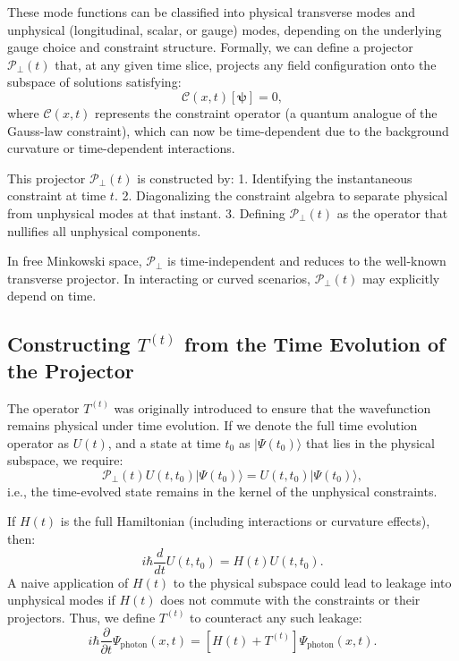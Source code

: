 \documentclass[aps,prl,twocolumn,showpacs,showkeys,superscriptaddress,amsmath,amssymb]{revtex4-2}
\begin{document}
These mode functions can be classified into physical transverse modes and unphysical (longitudinal, scalar, or gauge) modes, depending on the underlying gauge choice and constraint structure. Formally, we can define a projector $\mathcal{P}_\perp(t)$ that, at any given time slice, projects any field configuration onto the subspace of solutions satisfying:
\begin{equation}
\mathcal{C}(x,t)[\bm{\psi}] = 0,
\end{equation}
where $\mathcal{C}(x,t)$ represents the constraint operator (a quantum analogue of the Gauss-law constraint), which can now be time-dependent due to the background curvature or time-dependent interactions.

This projector $\mathcal{P}_\perp(t)$ is constructed by:
1. Identifying the instantaneous constraint at time $t$.
2. Diagonalizing the constraint algebra to separate physical from unphysical modes at that instant.
3. Defining $\mathcal{P}_\perp(t)$ as the operator that nullifies all unphysical components.

In free Minkowski space, $\mathcal{P}_\perp$ is time-independent and reduces to the well-known transverse projector. In interacting or curved scenarios, $\mathcal{P}_\perp(t)$ may explicitly depend on time.

\subsection{Constructing \texorpdfstring{$T^{(t)}$}{T(t)} from the Time Evolution of the Projector}

The operator $T^{(t)}$ was originally introduced to ensure that the wavefunction remains physical under time evolution. If we denote the full time evolution operator as $U(t)$, and a state at time $t_0$ as $|\Psi(t_0)\rangle$ that lies in the physical subspace, we require:
\begin{equation}
\mathcal{P}_\perp(t) U(t,t_0)|\Psi(t_0)\rangle = U(t,t_0)|\Psi(t_0)\rangle,
\end{equation}
i.e., the time-evolved state remains in the kernel of the unphysical constraints.

If $H(t)$ is the full Hamiltonian (including interactions or curvature effects), then:
\begin{equation}
i\hbar \frac{d}{dt}U(t,t_0) = H(t)U(t,t_0).
\end{equation}
A naive application of $H(t)$ to the physical subspace could lead to leakage into unphysical modes if $H(t)$ does not commute with the constraints or their projectors. Thus, we define $T^{(t)}$ to counteract any such leakage:
\begin{equation}
i\hbar \frac{\partial}{\partial t}\Psi_{\text{photon}}(x,t) = [H(t) + T^{(t)}]\Psi_{\text{photon}}(x,t).
\end{equation}
\end{document}
